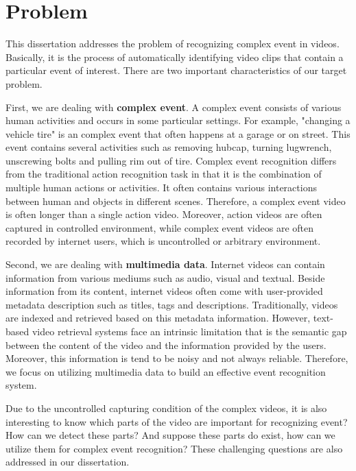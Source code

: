 \section{Problem}
\label{c1_problemdefinition}
This dissertation addresses the problem of recognizing complex event in videos. Basically, it is the process of automatically identifying video clips that contain a particular event of interest. There are two important characteristics of our target problem. 

First, we are dealing with \textbf{complex event}. A complex event consists of various human activities and occurs in some particular settings. For example, "changing a vehicle tire" is an complex event that often happens at a garage or on street. This event contains several activities such as removing hubcap, turning lugwrench, unscrewing bolts and pulling rim out of tire. Complex event recognition differs from the traditional action recognition task in that it is the combination of multiple human actions or activities. It often contains various interactions between human and objects in different scenes. Therefore, a complex event video is often longer than a single action video. Moreover, action videos are often captured in controlled environment, while complex event videos are often recorded by internet users, which is uncontrolled or arbitrary environment. 

Second, we are dealing with \textbf{multimedia data}. Internet videos can contain information from various mediums such as audio, visual and textual. Beside information from its content, internet videos often come with user-provided metadata description such as titles, tags and descriptions. Traditionally, videos are indexed and retrieved based on this metadata information. However, text-based video retrieval systems face an intrinsic limitation that is the semantic gap between the content of the video and the information provided by the users. Moreover, this information is tend to be noisy and not always reliable. Therefore, we focus on utilizing multimedia data to build an effective event recognition system.

Due to the uncontrolled capturing condition of the complex videos, it is also interesting to know which parts of the video are important for recognizing event? How can we detect these parts? And suppose these parts do exist, how can we utilize them for complex event recognition? These challenging questions are also addressed in our dissertation.  

